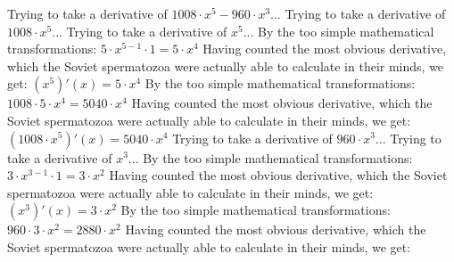 \documentclass[a4paper, 12pt]{article}
\begin{document}
\newline
Trying to take a derivative of ${{{1008} \cdot {{x} ^ {5}}} - {{960} \cdot {{x} ^ {3}}}}$...\newline
\newline
Trying to take a derivative of ${{1008} \cdot {{x} ^ {5}}}$...\newline
\newline
Trying to take a derivative of ${{x} ^ {5}}$...\newline
\newline
By the too simple mathematical transformations:
 ${{{5} \cdot {{x} ^ {{5} - {1}}}} \cdot {1}} = {{5} \cdot {{x} ^ {4}}}$ 
 \newline
 \newline 
Having counted the most obvious derivative, which the Soviet spermatozoa were actually able to calculate in their minds, we get:
$({{x} ^ {5}})'(x) = {{5} \cdot {{x} ^ {4}}}$\newline
\newline
By the too simple mathematical transformations:
 ${{1008} \cdot {{5} \cdot {{x} ^ {4}}}} = {{5040} \cdot {{x} ^ {4}}}$ 
 \newline
 \newline 
Having counted the most obvious derivative, which the Soviet spermatozoa were actually able to calculate in their minds, we get:
$({{1008} \cdot {{x} ^ {5}}})'(x) = {{5040} \cdot {{x} ^ {4}}}$\newline
\newline
Trying to take a derivative of ${{960} \cdot {{x} ^ {3}}}$...\newline
\newline
Trying to take a derivative of ${{x} ^ {3}}$...\newline
\newline
By the too simple mathematical transformations:
 ${{{3} \cdot {{x} ^ {{3} - {1}}}} \cdot {1}} = {{3} \cdot {{x} ^ {2}}}$ 
 \newline
 \newline 
Having counted the most obvious derivative, which the Soviet spermatozoa were actually able to calculate in their minds, we get:
$({{x} ^ {3}})'(x) = {{3} \cdot {{x} ^ {2}}}$\newline
\newline
By the too simple mathematical transformations:
 ${{960} \cdot {{3} \cdot {{x} ^ {2}}}} = {{2880} \cdot {{x} ^ {2}}}$ 
 \newline
 \newline 
Having counted the most obvious derivative, which the Soviet spermatozoa were actually able to calculate in their minds, we get:
\end{document}
